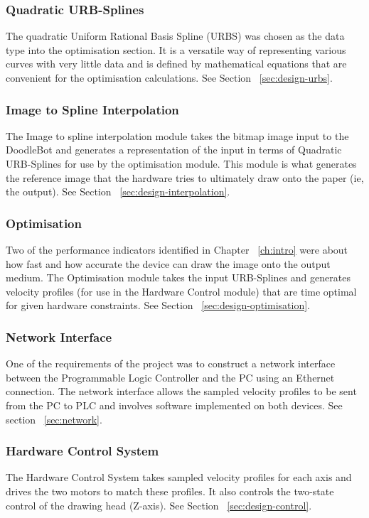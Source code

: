 	\subsubsection*{Quadratic URB-Splines}
		The quadratic Uniform Rational Basis Spline (URBS) was chosen as the data type into the optimisation section. It is a versatile way of representing various curves with very little data and is defined by mathematical equations that are convenient for the optimisation calculations. See Section ~\ref{sec:design-urbs}.
		
	\subsubsection*{Image to Spline Interpolation}
		The Image to spline interpolation module takes the bitmap image input to the DoodleBot and generates a representation of the input in terms of Quadratic URB-Splines for use by the optimisation module. This module is what generates the reference image that the hardware tries to ultimately draw onto the paper (ie, the output). See Section ~\ref{sec:design-interpolation}.
		
	\subsubsection*{Optimisation}
		Two of the performance indicators identified in Chapter ~\ref{ch:intro} were about how fast and how accurate the device can draw the image onto the output medium. The Optimisation module takes the input URB-Splines and generates velocity profiles (for use in the Hardware Control module) that are time optimal for given hardware constraints. See Section ~\ref{sec:design-optimisation}.

	\subsubsection*{Network Interface}
		One of the requirements of the project was to construct a network interface between the Programmable Logic Controller and the PC using an Ethernet connection. The network interface allows the sampled velocity profiles to be sent from the PC to PLC and involves software implemented on both devices. See section ~\ref{sec:network}.

	\subsubsection*{Hardware Control System}
		The Hardware Control System takes sampled velocity profiles for each axis and drives the two motors to match these profiles. It also controls the two-state control of the drawing head (Z-axis). See Section ~\ref{sec:design-control}.